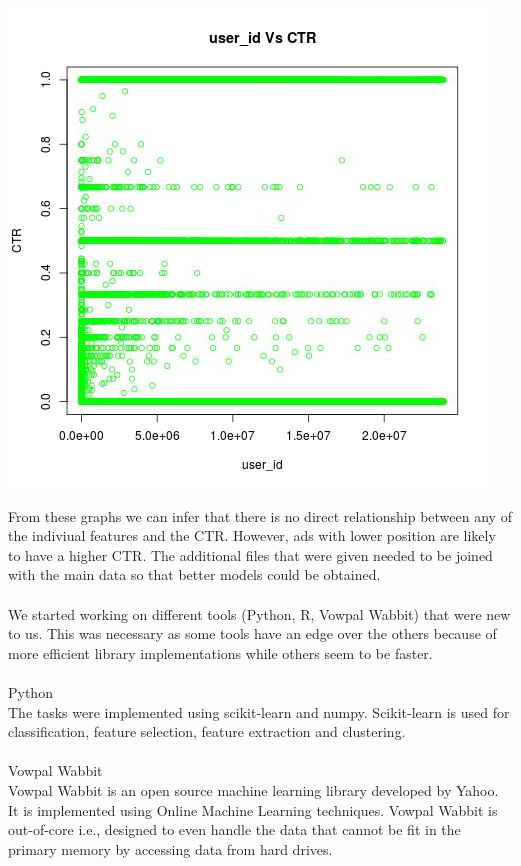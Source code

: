 \documentclass[10pt]{article}
\begin{document}
\includegraphics[scale=0.5]{user_id_Vs_CTR}

From these graphs we can infer that there is no direct relationship between any of the indiviual features and the CTR. However, ads with lower position are likely to have a higher CTR.
The additional files that were given needed to be joined with the main data so that better models could be obtained. \\\\

We started working on different tools (Python, R, Vowpal Wabbit) that were new to us. This was necessary as some tools have an edge over the others because of more efficient library implementations while others seem to be faster. \\\\

Python\\
The tasks were implemented using scikit-learn and numpy. Scikit-learn is used for classification, feature selection, feature extraction and clustering.\\\\

Vowpal Wabbit\\
Vowpal Wabbit is an open source machine learning library developed by Yahoo. It is implemented using Online Machine Learning techniques. Vowpal Wabbit is out-of-core i.e., designed to even handle the data that cannot be fit in the primary memory by accessing data from hard drives.\\\\
\end{document}
